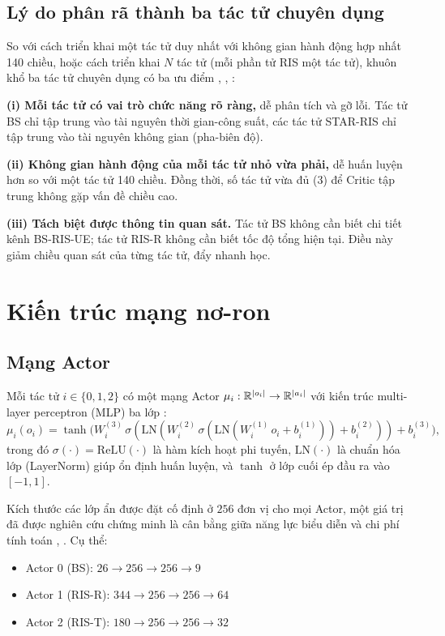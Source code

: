 \subsection{Lý do phân rã thành ba tác tử chuyên dụng}

So với cách triển khai một tác tử duy nhất với không gian hành động hợp
nhất 140 chiều, hoặc cách triển khai $N$ tác tử (mỗi phần tử RIS một tác
tử), khuôn khổ ba tác tử chuyên dụng có ba ưu điểm
\cite{lowe2017multi}, \cite{dange2026collaborative}, \cite{mirza2024multi}:

\textbf{(i) Mỗi tác tử có vai trò chức năng rõ ràng,} dễ phân tích và gỡ
lỗi. Tác tử BS chỉ tập trung vào tài nguyên thời gian-công suất, các tác
tử STAR-RIS chỉ tập trung vào tài nguyên không gian (pha-biên độ).

\textbf{(ii) Không gian hành động của mỗi tác tử nhỏ vừa phải,} dễ huấn
luyện hơn so với một tác tử 140 chiều. Đồng thời, số tác tử vừa đủ
(3) để Critic tập trung không gặp vấn đề chiều cao.

\textbf{(iii) Tách biệt được thông tin quan sát.} Tác tử BS không cần
biết chi tiết kênh BS-RIS-UE; tác tử RIS-R không cần biết tốc độ tổng
hiện tại. Điều này giảm chiều quan sát của từng tác tử, đẩy nhanh học.

\section{Kiến trúc mạng nơ-ron}
\label{sec:nn_architecture}

\subsection{Mạng Actor}

Mỗi tác tử $i \in \{0, 1, 2\}$ có một mạng Actor
$\mu_i: \mathbb{R}^{|o_i|} \to \mathbb{R}^{|a_i|}$ với kiến trúc multi-layer
perceptron (MLP) ba lớp \cite{lillicrap2016continuous}:
\begin{equation}
\mu_i(o_i) = \tanh\!\big(W^{(3)}_i\,\sigma(\mathrm{LN}(W^{(2)}_i\,
            \sigma(\mathrm{LN}(W^{(1)}_i\,o_i + b^{(1)}_i)) + b^{(2)}_i))
            + b^{(3)}_i\big),
\label{eq:actor_nn}
\end{equation}
trong đó $\sigma(\cdot) = \mathrm{ReLU}(\cdot)$ là hàm kích hoạt phi
tuyến, $\mathrm{LN}(\cdot)$ là chuẩn hóa lớp (LayerNorm) giúp ổn định
huấn luyện, và $\tanh$ ở lớp cuối ép đầu ra vào $[-1, 1]$.

Kích thước các lớp ẩn được đặt cố định ở $256$ đơn vị cho mọi Actor, một
giá trị đã được nghiên cứu chứng minh là cân bằng giữa năng lực biểu
diễn và chi phí tính toán \cite{lillicrap2016continuous}, \cite{fujimoto2018addressing}.
Cụ thể:
\begin{itemize}[leftmargin=*]
\item Actor 0 (BS): $26 \to 256 \to 256 \to 9$
\item Actor 1 (RIS-R): $344 \to 256 \to 256 \to 64$
\item Actor 2 (RIS-T): $180 \to 256 \to 256 \to 32$
\end{itemize}

